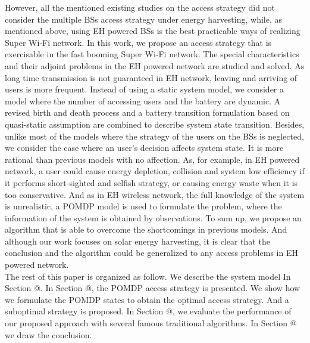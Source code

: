 \documentclass[conference]{IEEEtran}
\makeatletter
\newcommand{\Rmnum}[1]{\expandafter\@slowromancap\romannumeral #1@}
\makeatother
\begin{document}
\indent However, all the mentioned existing studies on the access strategy did not consider the
multiple BSs access strategy under energy harvesting, while, as mentioned above,
using EH powered BSs is the best practicable ways of realizing Super Wi-Fi network.
In this work, we propose an access strategy that is exercisable in the fast booming Super Wi-Fi network.
The special characteristics and their adjoint problems in the EH powered network are studied and solved.
As long time transmission is not guaranteed in EH network,
leaving and arriving of users is more frequent.
Instead of using a static system model,
we consider a model where the number of accessing users and the battery are dynamic.
A revised birth and death process and a battery transition formulation based on quasi-static assumption
are combined to describe system state transition.
Besides, unlike most of the models where the strategy of the users on the BSs is neglected,
we consider the case where an user's decision affects system state.
It is more rational than previous models with no affection.
As, for example, in EH powered network, a user could cause energy depletion,
collision and system low efficiency if it performs short-sighted and selfish strategy,
or causing energy waste when it is too conservative.
And as in EH wireless network, the full knowledge of the system is unrealistic,
a POMDP model is used to formulate the problem, where the information of the system is obtained by observations.
To sum up, we propose an algorithm that is able to overcome the shortcomings in previous models.
And although our work focuses on solar energy harvesting,
it is clear that the conclusion and the algorithm could be generalized to any access problems in EH powered network.
\\
\indent The rest of this paper is organized as follow.
We describe the system model In Section \Rmnum{2}.
In Section \Rmnum{3}, the POMDP access strategy is presented.
We show how we formulate the POMDP states to obtain the optimal access strategy. 
And a suboptimal strategy is proposed.
In Section \Rmnum{4}, we evaluate the performance of our proposed approach with several famous traditional algorithms.
In Section \Rmnum{5} we draw the conclusion.
\end{document}
